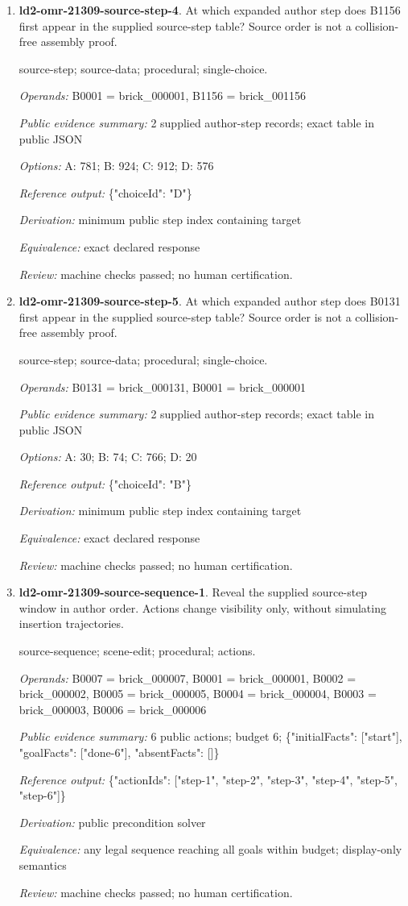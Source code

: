 \begin{enumerate}
\item \textbf{ld2-omr-21309-source-step-4}. At which expanded author step does B1156 first appear in the supplied source-step table? Source order is not a collision-free assembly proof.
\par{\small source-step; source-data; procedural; single-choice.\par\textit{Operands:} B0001 = brick\_000001, B1156 = brick\_001156\par\textit{Public evidence summary:} 2 supplied author-step records; exact table in public JSON\par\textit{Options:} A: 781; B: 924; C: 912; D: 576\par\textit{Reference output:} \{"choiceId": "D"\}\par\textit{Derivation:} minimum public step index containing target\par\textit{Equivalence:} exact declared response\par\textit{Review:} machine checks passed; no human certification.}
\item \textbf{ld2-omr-21309-source-step-5}. At which expanded author step does B0131 first appear in the supplied source-step table? Source order is not a collision-free assembly proof.
\par{\small source-step; source-data; procedural; single-choice.\par\textit{Operands:} B0131 = brick\_000131, B0001 = brick\_000001\par\textit{Public evidence summary:} 2 supplied author-step records; exact table in public JSON\par\textit{Options:} A: 30; B: 74; C: 766; D: 20\par\textit{Reference output:} \{"choiceId": "B"\}\par\textit{Derivation:} minimum public step index containing target\par\textit{Equivalence:} exact declared response\par\textit{Review:} machine checks passed; no human certification.}
\item \textbf{ld2-omr-21309-source-sequence-1}. Reveal the supplied source-step window in author order. Actions change visibility only, without simulating insertion trajectories.
\par{\small source-sequence; scene-edit; procedural; actions.\par\textit{Operands:} B0007 = brick\_000007, B0001 = brick\_000001, B0002 = brick\_000002, B0005 = brick\_000005, B0004 = brick\_000004, B0003 = brick\_000003, B0006 = brick\_000006\par\textit{Public evidence summary:} 6 public actions; budget 6; \{"initialFacts": ["start"], "goalFacts": ["done-6"], "absentFacts": []\}\par\textit{Reference output:} \{"actionIds": ["step-1", "step-2", "step-3", "step-4", "step-5", "step-6"]\}\par\textit{Derivation:} public precondition solver\par\textit{Equivalence:} any legal sequence reaching all goals within budget; display-only semantics\par\textit{Review:} machine checks passed; no human certification.}

\end{enumerate}
